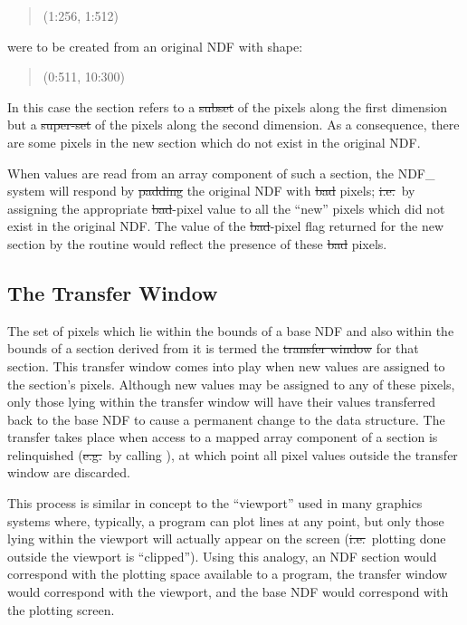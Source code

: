 \small
\begin{quote}
\begin{center}
(1:256, 1:512)
\end{center}
\end{quote}
\normalsize

were to be created from an original NDF with shape:

\small
\begin{quote}
\begin{center}
(0:511, 10:300)
\end{center}
\end{quote}
\normalsize

In this case the section refers to a \st{subset\/} of the pixels along the
first dimension but a \st{super-set\/} of the pixels along the second
dimension. 
As a consequence, there are some pixels in the new section which do not
exist in the original NDF. 

When values are read from an array component of such a section, the NDF\_
system will respond by \st{padding\/} the original NDF with \st{bad\/} pixels;
\st{i.e.}\ by assigning the appropriate \st{bad\/}-pixel value to all the
``new'' pixels which did not exist in the original NDF. 
The value of the \st{bad\/}-pixel flag returned for the new section by the 
routine  would reflect the presence of these \st{bad\/} pixels.

\subsection{The Transfer Window}

The set of pixels which lie within the bounds of a base NDF and also within
the bounds of a section derived from it is termed the \st{transfer window\/}
for that section. 
This transfer window comes into play when new values are assigned to the
section's pixels. 
Although new values may be assigned to any of these pixels, only those lying
within the transfer window will have their values transferred back to the
base NDF to cause a permanent change to the data structure. 
The transfer takes place when access to a mapped array component of a
section is relinquished (\st{e.g.}\ by calling ), at which point
all pixel values outside the transfer window are discarded. 

This process is similar in concept to the ``viewport'' used in many graphics
systems where, typically, a program can plot lines at any point, but only
those lying within the viewport will actually appear on the screen (\st{i.e.}\ plotting done outside the viewport is ``clipped''). 
Using this analogy, an NDF section would correspond with the plotting space
available to a program, the transfer window would correspond with the
viewport, and the base NDF would correspond with the plotting screen. 

